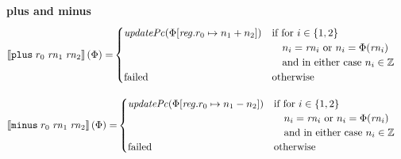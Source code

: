 \documentclass[a3paper]{article}
\newcommand{\sem}[1]{\left\llbracket #1 \right\rrbracket}
\newcommand{\targetcolor}[1]{\color{black}}
\newcommand{\trg}[1]{{\targetcolor{} #1}}
\newcommand{\zinstr}[1]{\texttt{#1}}
\newcommand{\threeinstr}[4]{
  \ifthenelse{\equal{#2#3#4}{}}
  {\zinstr{#1}}
  {\zinstr{#1} \; #2 \; #3 \; #4}
}
\newcommand{\tplus}[3]{\threeinstr{\trg{plus}}{#1}{#2}{#3}}
\newcommand{\tminus}[3]{\threeinstr{\trg{minus}}{#1}{#2}{#3}}
\newcommand{\ints}{\mathbb{Z}}
\newcommand{\update}[2]{[#1 \mapsto #2]}
\newcommand{\updReg}[2]{\update{\reg.#1}{#2}}
\newcommand{\failed}{\mathrm{failed}}
\newcommand{\var}[1]{\mathit{#1}}
\newcommand{\rn}{\var{rn}}
\newcommand{\reg}{\var{reg}}
\newcommand{\plainfun}[2]{
  \ifthenelse{\equal{#2}{}}
  {\mathit{#1}}
  {\mathit{#1}(#2)}
}
\newcommand{\updPcAddr}[1]{\plainfun{updatePc}{#1}}
\begin{document}
\noindent\textbf{plus and minus}\\
\begin{align*}
  \sem{\tplus{r_0}{\rn_1}{\rn_2}}(\Phi) = &
                                                  \begin{cases}
                                                    \updPcAddr{\Phi\updReg{r_0}{n_1+n_2}} &
                                                    \arraycolsep=0pt
                                                    \begin{array}[t]{l}
                                                      \text{if for $i \in \{1,2\}$}\\
                                                      \quad\text{$n_i = \rn_i$ or $n_i = \Phi(\rn_i)$}\\
                                                      \quad\text{and in either case $n_i \in \ints$}\\
                                                    \end{array}\\
                                                    \failed & \text{otherwise}
                                                  \end{cases}  
\end{align*}

\begin{align*}
  \sem{\tminus{r_0}{\rn_1}{\rn_2}}(\Phi) = &
                                                  \begin{cases}
                                                    \updPcAddr{\Phi\updReg{r_0}{n_1-n_2}} &
                                                    \arraycolsep=0pt
                                                    \begin{array}[t]{l}
                                                      \text{if for $i \in \{1,2\}$}\\
                                                      \quad\text{$n_i = \rn_i$ or $n_i = \Phi(\rn_i)$}\\
                                                      \quad\text{and in either case $n_i \in \ints$}\\
                                                    \end{array}\\
                                                    \failed & \text{otherwise}
                                                  \end{cases}  
\end{align*}
\end{document}
